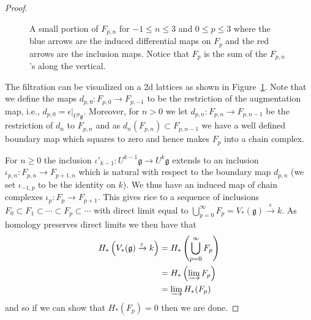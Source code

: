 \begin{proof}
\begin{figure}[t]
\begin{center}
    \end{center}
    \caption{A small portion of $ F_{p, n} $ for $ -1 \leq n \leq 3 $ and $ 0 \leq p \leq 3 $ where the blue arrows are the induced differential maps on $ F_p $ and the red arrows are the inclusion maps. Notice that $ F_p $ is the sum of the $ F_{p,n} $'s along the vertical.}\label{fig:filtrationf}
  \end{figure}
  The filtration can be visualized on a 2d lattices as shown in Figure~\ref{fig:filtrationf}. Note that we define the maps $ d_{p, 0}:F_{p, 0} \to F_{p, -1} $ to be the restriction of the augmentation map, i.e., $ d_{p, 0} = \epsilon|_{U^{p}\mathfrak{g}} $. Moreover, for $ n>0 $ we let $ d_{p, n}: F_{p, n} \to F_{p, n-1} $ be the restriction of $ d_n $ to $ F_{p,n} $ and as $ d_n(F_{p, n}) \subset F_{p, n-1} $ we have a well defined boundary map which squares to zero and hence makes $ F_p $ into a chain complex.

  For $ n\geq 0 $ the inclusion $\iota'_{k-1}: U^{k-1}\mathfrak{g} \to U^{k}\mathfrak{g} $ extends to an inclusion $ \iota_{p, n}: F_{p, n} \to F_{p+1, n} $ which is natural with respect to the boundary map $ d_{p, n} $ (we set $ \iota_{-1, p} $ to be the identity on $ k $). We thus have an induced map of chain complexes $ \iota_p: F_p \to F_{p + 1} $. This gives rice to a sequence of inclusions $ F_0 \subset F_1 \subset \cdots \subset F_p \subset \cdots $ with direct limit equal to $ \bigcup_{p = 0}^{\infty} F_p = V_{*}(\mathfrak{g}) \xrightarrow{\epsilon} k $. As homology preserves direct limits we then have that
  \begin{align*}
    H_*\left( V_{*}(\mathfrak{g}) \xrightarrow{\epsilon} k\right) &= H_* \left( \bigcup_{p = 0}^{\infty} F_p \right) \\
                                                                  &= H_* \left( \varinjlim{F_p} \right) \\
                                                                  &= \varinjlim{H_*(F_p)}
  \end{align*}
  and so if we can show that $ H_*(F_p) = 0 $ then we are done.


\end{proof}
